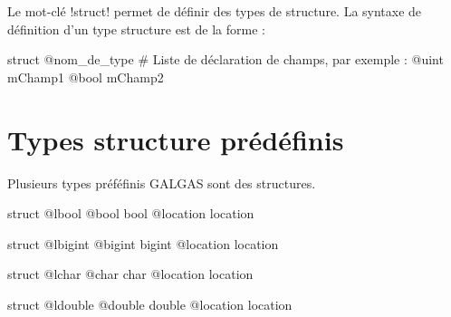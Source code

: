


Le mot-clé \ggs!struct! permet de définir des types de structure. La syntaxe de définition d'un type structure est de la forme :

\begin{galgas}
struct @nom_de_type
  # Liste de déclaration de champs, par exemple :
  @uint mChamp1
  @bool mChamp2
\end{galgas}


\section{Types structure prédéfinis}

Plusieurs types préféfinis GALGAS sont des structures.
 

\begin{galgas}
struct @lbool {
  @bool bool
  @location location
}
\end{galgas}
 

\begin{galgas}
struct @lbigint {
  @bigint bigint
  @location location
}
\end{galgas}





\begin{galgas}
struct @lchar {
  @char char
  @location location
}
\end{galgas}








\begin{galgas}
struct @ldouble {
  @double double
  @location location
}
\end{galgas}








